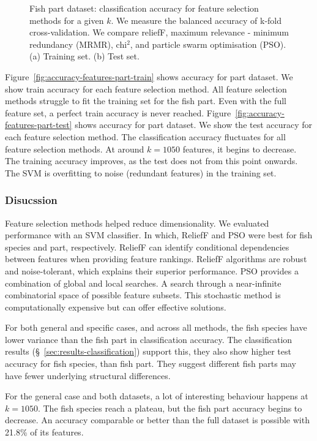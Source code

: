 \documentclass{article}
\begin{document}
\begin{figure}[htb]
  \caption[Two numerical solutions]{
    Fish part dataset: classification accuracy for feature selection methods for a given $k$.
    We measure the balanced accuracy of k-fold cross-validation.
    We compare reliefF, maximum relevance - minimum redundancy (MRMR), chi$^2$, and particle swarm optimisation (PSO).
    (a) Training set. (b) Test set.}
\end{figure}

Figure~\ref{fig:accuracy-features-part-train} shows accuracy for part dataset.
We show train accuracy for each feature selection method.
All feature selection methods struggle to fit the training set for the fish part.
Even with the full feature set, a perfect train accuracy is never reached.
Figure~\ref{fig:accuracy-features-part-test} shows accuracy for part dataset.
We show the test accuracy for each feature selection method.
The classification accuracy fluctuates for all feature selection methods.
At around $k=1050$ features, it begins to decrease.
The training accuracy improves, as the test does not from this point onwards.
The SVM is overfitting to noise (redundant features) in the training set.

\subsubsection{Disucssion}
\label{sec:results-feature-selection-discussion}

Feature selection methods helped reduce dimensionality.
We evaluated performance with an SVM classifier.
In which, ReliefF and PSO were best for fish species and part, respectively.
ReliefF can identify conditional dependencies between features when providing feature rankings.
ReliefF algorithms are robust and noise-tolerant, which explains their superior performance.
PSO provides a combination of global and local searches.
A search through a near-infinite combinatorial space of possible feature subsets.
This stochastic method is computationally expensive but can offer effective solutions.

For both general and specific cases, and across all methods, the fish species have lower variance than the fish part in classification accuracy.
The classification results (\S~\ref{sec:results-classification}) support this, they also show higher test accuracy for fish species, than fish part.
They suggest different fish parts may have fewer underlying structural differences.

For the general case and both datasets, a lot of interesting behaviour happens at $k=1050$.
The fish species reach a plateau, but the fish part accuracy begins to decrease.
An accuracy comparable or better than the full dataset is possible with 21.8\% of its features.
\end{document}

